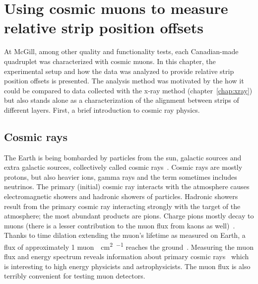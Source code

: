 
\chapter{Using cosmic muons to measure relative strip position offsets}
\label{chap:cosmics}

At McGill, among other quality and functionality tests, each Canadian-made quadruplet was characterized with cosmic muons. In this chapter, the experimental setup and how the data was analyzed to provide relative strip position offsets is presented. The analysis method was motivated by the how it could be compared to data collected with the x-ray method (chapter~\ref{chap:xray}) but also stands alone as a characterization of the alignment between strips of different layers. First, a brief introduction to cosmic ray physics.

\section{Cosmic rays}

The Earth is being bombarded by particles from the sun, galactic sources and extra galactic sources, collectively called cosmic rays~\cite{boezio_chemical_2012, zyla_review_2020}. Cosmic rays are mostly protons, but also heavier ions, gamma rays and the term sometimes includes neutrinos. The primary (initial) cosmic ray interacts with the atmosphere causes electromagnetic showers and hadronic showers of particles. Hadronic showers result from the primary cosmic ray interacting strongly with the target of the atmosphere; the most abundant products are pions. Charge pions mostly decay to muons (there is a lesser contribution to the muon flux from kaons as well)~\cite{grieder_cosmic_2001}. Thanks to time dilation extending the muon's lifetime as measured on Earth, a flux of approximately 1 muon\SI{}{\per\cm\squared\per\min} reaches the ground~\cite{zyla_review_2020}. Measuring the muon flux and energy spectrum reveals information about primary cosmic rays~\cite{grieder_cosmic_2001} which is interesting to high energy physicists and astrophysicists. The muon flux is also terribly convenient for testing muon detectors.

